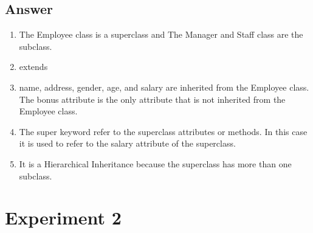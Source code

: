 \documentclass[12pt,titlepage]{article}
\begin{document}
\subsection{Answer}
\begin{enumerate}
    \item The Employee class is a superclass and The Manager and Staff class are the subclass.
    \item extends
    \item name, address, gender, age, and salary are inherited from the Employee class. The bonus attribute is the only attribute that is not inherited from the Employee class.
    \item The super keyword refer to the superclass attributes or methods. In this case it is used to refer to the salary attribute of the superclass.
    \item It is a Hierarchical Inheritance because the superclass has more than one subclass.
\end{enumerate}

\newpage

\section{Experiment 2}
\end{document}
